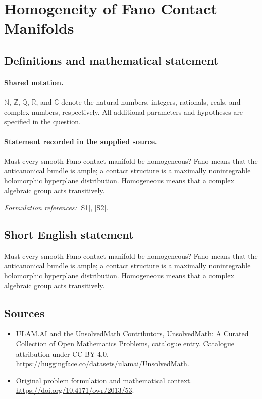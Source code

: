 \documentclass[11pt]{article}
\newcommand{\sref}[2]{\hyperlink{source:#1:#2}{[S#2]}}
\begin{document}
\section{Homogeneity of Fano Contact Manifolds}\label{statement}

\subsection{Definitions and mathematical statement}

\paragraph{Shared notation.}$\mathbb N$, $\mathbb Z$, $\mathbb Q$, $\mathbb R$, and $\mathbb C$ denote the natural numbers, integers, rationals, reals, and complex numbers, respectively. All additional parameters and hypotheses are specified in the question.


\paragraph{Statement recorded in the supplied source.}
Must every smooth Fano contact manifold be homogeneous? Fano means that the anticanonical bundle is ample; a contact structure is a maximally nonintegrable holomorphic hyperplane distribution. Homogeneous means that a complex algebraic group acts transitively.
\par\smallskip\textit{Formulation references:} \sref{statement}{1}, \sref{statement}{2}.
\subsection{Short English statement}
Must every smooth Fano contact manifold be homogeneous? Fano means that the anticanonical bundle is ample; a contact structure is a maximally nonintegrable holomorphic hyperplane distribution. Homogeneous means that a complex algebraic group acts transitively.
\subsection{Sources}
\begin{itemize}
\item[\hypertarget{source:statement:1}{S1}] ULAM.AI and the UnsolvedMath Contributors, UnsolvedMath: A Curated Collection of Open Mathematics Problems, catalogue entry. Catalogue attribution under CC BY 4.0.
\url{https://huggingface.co/datasets/ulamai/UnsolvedMath}.
\item[\hypertarget{source:statement:2}{S2}] Original problem formulation and mathematical context.
\url{https://doi.org/10.4171/owr/2013/53}.
\end{itemize}
\label{end:statement}
\end{document}
